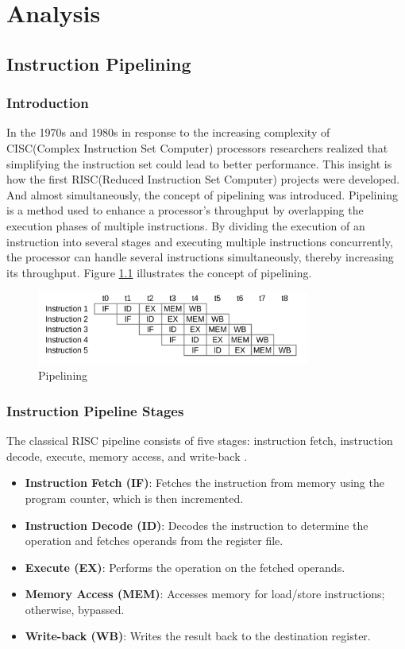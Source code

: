 \chapter{Analysis}

\section {Instruction Pipelining}
\subsection {Introduction}
In the 1970s and 1980s in response to the increasing complexity of CISC(Complex Instruction Set Computer) processors researchers realized that simplifying the instruction set could lead to better performance. This insight is how the first RISC(Reduced Instruction Set Computer) projects were developed\cite{aletan1992overview}.
And almost simultaneously, the concept of pipelining was introduced. Pipelining is a method used to enhance a processor's throughput by overlapping the execution phases of multiple instructions. By dividing the execution of an instruction into several stages and executing multiple instructions concurrently, the processor can handle several instructions simultaneously, thereby increasing its throughput\cite{olanrewaju2017design}. Figure \ref{fig:pipeline} illustrates the concept of pipelining.
\begin{figure}[H]
    \centering
    \includegraphics[width=0.8\textwidth]{assets/images/pipeline.png}
    \caption{Pipelining}
    \label{fig:pipeline}
\end{figure}


\subsection {Instruction Pipeline Stages}
The classical RISC pipeline consists of five stages: instruction fetch, instruction decode, execute, memory access, and write-back \cite{enwiki:1255528196}. 

\begin{itemize}
     \item \textbf{Instruction Fetch (IF)}: Fetches the instruction from memory using the program counter, which is then incremented.
     \item \textbf{Instruction Decode (ID)}: Decodes the instruction to determine the operation and fetches operands from the register file.
     \item \textbf{Execute (EX)}: Performs the operation on the fetched operands.
     \item \textbf{Memory Access (MEM)}: Accesses memory for load/store instructions; otherwise, bypassed.
     \item \textbf{Write-back (WB)}: Writes the result back to the destination register.
\end{itemize}\cite{he2023survey}

